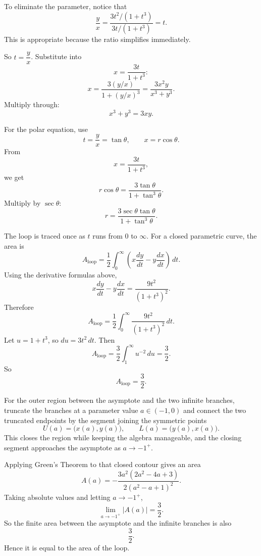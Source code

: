 \documentclass[a4paper,12pt,twocolumn]{article}
\newenvironment{solutionbox}{\begin{framed}}{\end{framed}}
\begin{document}
\begin{solutionbox}
\begin{steps}
\item To eliminate the parameter, notice that
\[
\frac{y}{x}
=\frac{3t^2/(1+t^3)}{3t/(1+t^3)}
=t.
\]
This is appropriate because the ratio simplifies immediately.

So \(t=\dfrac{y}{x}\). Substitute into
\[
x=\frac{3t}{1+t^3}:
\]
\[
x=\frac{3(y/x)}{1+(y/x)^3}
=\frac{3x^2y}{x^3+y^3}.
\]
Multiply through:
\[
\boxed{x^3+y^3=3xy.}
\]

\item For the polar equation, use
\[
t=\frac{y}{x}=\tan\theta,
\qquad
x=r\cos\theta.
\]
From
\[
x=\frac{3t}{1+t^3},
\]
we get
\[
r\cos\theta=\frac{3\tan\theta}{1+\tan^3\theta}.
\]
Multiply by \(\sec\theta\):
\[
\boxed{r=\frac{3\sec\theta\tan\theta}{1+\tan^3\theta}.}
\]

\item The loop is traced once as \(t\) runs from \(0\) to \(\infty\). For a closed parametric curve, the area is
\[
A_{\text{loop}}
=\frac12\int_0^\infty\left(x\frac{dy}{dt}-y\frac{dx}{dt}\right)\,dt.
\]
Using the derivative formulas above,
\[
x\frac{dy}{dt}-y\frac{dx}{dt}
=\frac{9t^2}{(1+t^3)^2}.
\]
Therefore
\[
A_{\text{loop}}
=\frac12\int_0^\infty \frac{9t^2}{(1+t^3)^2}\,dt.
\]
Let \(u=1+t^3\), so \(du=3t^2\,dt\). Then
\[
A_{\text{loop}}
=\frac32\int_1^\infty u^{-2}\,du
=\frac32.
\]
So
\[
\boxed{A_{\text{loop}}=\frac32.}
\]

\item For the outer region between the asymptote and the two infinite branches, truncate the branches at a parameter value \(a\in(-1,0)\) and connect the two truncated endpoints by the segment joining the symmetric points
\[
U(a)=\bigl(x(a),y(a)\bigr),
\qquad
L(a)=\bigl(y(a),x(a)\bigr).
\]
This closes the region while keeping the algebra manageable, and the closing segment approaches the asymptote as \(a\to-1^+\).

Applying Green's Theorem to that closed contour gives an area
\[
A(a)
=-\frac{3a^2(2a^2-4a+3)}{2(a^2-a+1)^2}.
\]
Taking absolute values and letting \(a\to-1^+\),
\[
\lim_{a\to-1^+}|A(a)|
=\frac32.
\]
So the finite area between the asymptote and the infinite branches is also
\[
\boxed{\frac32.}
\]
Hence it is equal to the area of the loop.
\end{steps}
\end{solutionbox}
\end{document}
